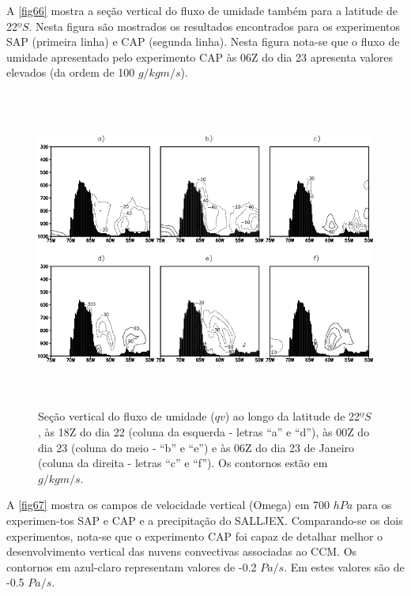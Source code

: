 A \autoref{fig66} mostra a seção vertical do fluxo de umidade também para a latitude de 22$ºS$. Nesta figura são mostrados os resultados encontrados para os experimentos SAP (primeira linha) e CAP (segunda linha). Nesta figura nota-se que o fluxo de umidade apresentado pelo experimento CAP às 06Z do dia 23 apresenta valores elevados (da ordem de 100 $g/kg m/s$).

\begin{figure}[!h]
\centering
\includegraphics[height=10.5cm]{./figs/sec_vert_flux_umi.png}
\caption{Seção vertical do fluxo de umidade ($qv$) ao longo da latitude de 22$ºS$, às 18Z do dia 22 (coluna da esquerda - letras ``a'' e ``d''), às 00Z do dia 23 (coluna do meio - ``b'' e ``e'') e às 06Z do dia 23 de Janeiro (coluna da direita - letras ``c'' e ``f''). Os contornos estão em $g/kg m/s$.}
\label{fig66}
\end{figure}

A \autoref{fig67} mostra os campos de velocidade vertical (Omega) em 700 $hPa$ para os experimen-tos SAP e CAP e a precipitação do SALLJEX. Comparando-se os dois experimentos, nota-se que o experimento CAP foi capaz de detalhar melhor o desenvolvimento vertical das nuvens convectivas associadas ao CCM. Os contornos em azul-claro representam valores de -0.2 $Pa/s$. Em  estes valores são de -0.5 $Pa/s$.
 
